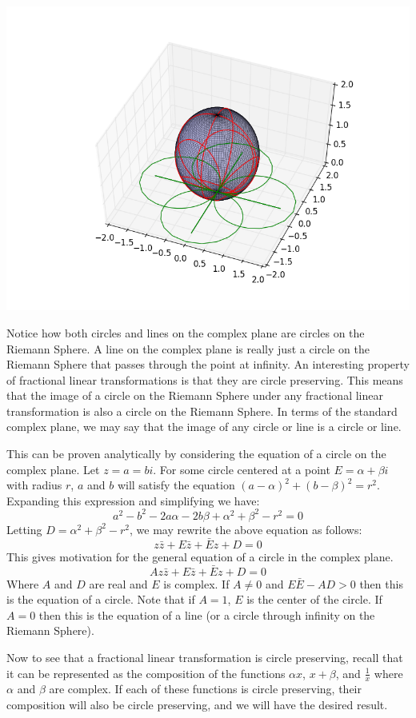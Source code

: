 \includegraphics[width=\textwidth]{mobius3.png}

Notice how both circles and lines on the complex plane are circles on the Riemann Sphere. A line on the complex plane is really just a circle on the Riemann Sphere that passes through the point at infinity. An interesting property of fractional linear transformations is that they are circle preserving. This means that the image of a circle on the Riemann Sphere under any fractional linear transformation is also a circle on the Riemann Sphere. In terms of the standard complex plane, we may say that the image of any circle or line is a circle or line.

This can be proven analytically by considering the equation of a circle on the complex plane. Let $z=a=bi$. For some circle centered at a point $E=\alpha + \beta i$ with radius $r$, $a$ and $b$ will satisfy the equation $(a-\alpha)^2+(b-\beta)^2=r^2$. Expanding this expression and simplifying we have:
$$a^2-b^2-2a\alpha-2b\beta+\alpha^2+\beta^2-r^2=0$$
Letting $D=\alpha^2+\beta^2-r^2$, we may rewrite the above equation as follows:
$$z\bar{z}+E\bar{z}+\bar{E}z+D=0$$
This gives motivation for the general equation of a circle in the complex plane.
$$Az\bar{z}+E\bar{z}+\bar{E}z+D=0$$
Where $A$ and $D$ are real and $E$ is complex. If $A\neq 0$ and $E\bar{E}-AD>0$ then this is the equation of a circle. Note that if $A=1$, $E$ is the center of the circle. If $A=0$ then this is the equation of a line (or a circle through infinity on the Riemann Sphere).

Now to see that a fractional linear transformation is circle preserving, recall that it can be represented as the composition of the functions $\alpha x$, $x+\beta$, and $\frac{1}{x}$ where $\alpha$ and $\beta$ are complex. If each of these functions is circle preserving, their composition will also be circle preserving, and we will have the desired result. 


